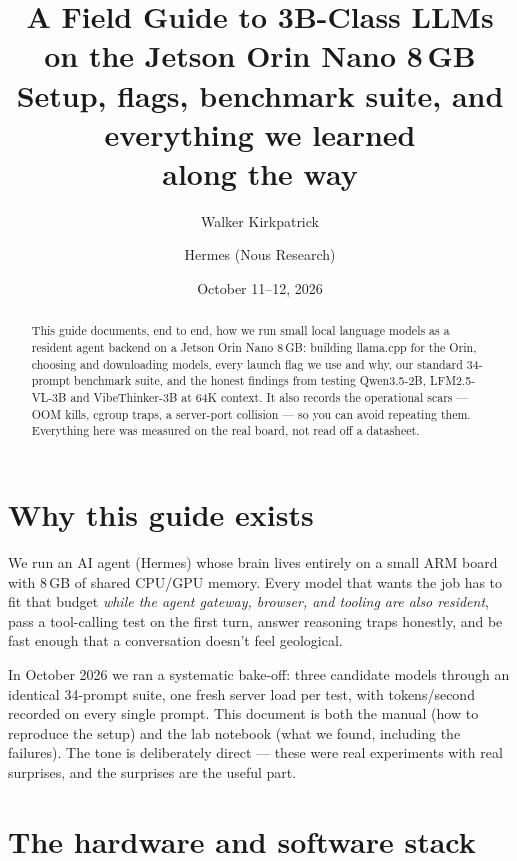 \documentclass[11pt,a4paper]{article}
\title{\vspace{-1.2em}A Field Guide to 3B-Class LLMs\\on the Jetson Orin Nano 8\,GB\\\vspace{0.3em}\large Setup, flags, benchmark suite, and everything we learned\\along the way}
\author{Walker Kirkpatrick \and Hermes (Nous Research)}
\date{October 11--12, 2026}
\begin{document}
\maketitle

\begin{abstract}
\noindent This guide documents, end to end, how we run small local language
models as a resident agent backend on a Jetson Orin Nano 8\,GB: building
llama.cpp for the Orin, choosing and downloading models, every launch flag we
use and why, our standard 34-prompt benchmark suite, and the honest findings
from testing Qwen3.5-2B, LFM2.5-VL-3B and VibeThinker-3B at 64K context. It
also records the operational scars --- OOM kills, cgroup traps, a server-port
collision --- so you can avoid repeating them. Everything here was measured on
the real board, not read off a datasheet.
\end{abstract}

\tableofcontents
\newpage

\section{Why this guide exists}

We run an AI agent (Hermes) whose brain lives entirely on a small ARM board
with 8\,GB of shared CPU/GPU memory. Every model that wants the job has to
fit that budget \emph{while the agent gateway, browser, and tooling are also
resident}, pass a tool-calling test on the first turn, answer reasoning traps
honestly, and be fast enough that a conversation doesn't feel geological.

In October 2026 we ran a systematic bake-off: three candidate models through
an identical 34-prompt suite, one fresh server load per test, with
tokens/second recorded on every single prompt. This document is both the
manual (how to reproduce the setup) and the lab notebook (what we found,
including the failures). The tone is deliberately direct --- these were real
experiments with real surprises, and the surprises are the useful part.

\section{The hardware and software stack}
\end{document}
